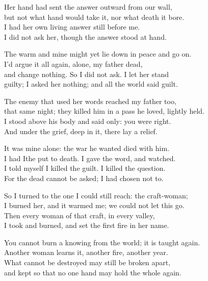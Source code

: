 \begin{founder}
Her hand had sent the answer outward from our wall,\\
but not what hand would take it, nor what death it bore.\\
I had her own living answer still before me.\\
I did not ask her, though the answer stood at hand.\\
\medskip

The warm and mine might yet lie down in peace and go on.\\
I'd argue it all again, alone, my father dead,\\
and change nothing. So I did not ask. I let her stand\\
guilty; I asked her nothing; and all the world said guilt.\\

\ornament

The enemy that used her words reached my father too,\\
that same night; they killed him in a pass he loved, lightly held.\\
I stood above his body and said only: you were right.\\
And under the grief, deep in it, there lay a relief.\\
\medskip

It was mine alone: the war he wanted died with him.\\
I had Ithe put to death. I gave the word, and watched.\\
I told myself I killed the guilt. I killed the question.\\
For the dead cannot be asked; I had chosen not to.\\
\medskip

So I turned to the one I could still reach: the craft-woman;\\
I burned her, and it warmed me; we could not let this go.\\
Then every woman of that craft, in every valley,\\
I took and burned, and set the first fire in her name.\\
\medskip

You cannot burn a knowing from the world; it is taught again.\\
Another woman learns it, another fire, another year.\\
What cannot be destroyed may still be broken apart,\\
and kept so that no one hand may hold the whole again.\\


\end{founder}
